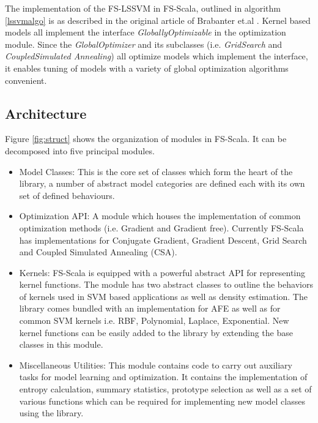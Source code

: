 \documentclass[conference, cmex10]{IEEEtran}
\begin{document}
The implementation of the FS-LSSVM in FS-Scala, outlined in algorithm \ref{lssvmalgo} is as described in the original article of Brabanter et.al \cite{DeBrabanter2010}. Kernel based models all implement the interface \textit{GloballyOptimizable} in the optimization module. Since the \textit{GlobalOptimizer} and its subclasses (i.e. \textit{GridSearch} and \textit{CoupledSimulated Annealing}) all optimize models which implement the  interface, it enables tuning of models with a variety of global optimization algorithms convenient.

\subsection*{Architecture} \label{archi}

Figure \ref{fig:struct} shows the organization of modules in FS-Scala. It can be decomposed into five principal modules.
\begin{itemize}
\item Model Classes:
This is the core set of classes which form the heart of the library, a number of abstract model categories are defined each with its own set of defined behaviours. 
\item Optimization API:
A module which houses the implementation of common optimization methods (i.e. Gradient and Gradient free). Currently FS-Scala has implementations for Conjugate Gradient, Gradient Descent, Grid Search and Coupled Simulated Annealing \cite{Xavier-De-Souza2010} (CSA). 
\item Kernels:
FS-Scala is equipped with a powerful abstract API for representing kernel functions. The module has two abstract classes to outline the behaviors of kernels used in SVM based applications as well as density estimation. The library comes bundled with an implementation for AFE as well as for common SVM kernels i.e. RBF, Polynomial, Laplace, Exponential. New kernel functions can be easily added to the library by extending the base classes in this module.

\item Miscellaneous Utilities:
This module contains code to carry out auxiliary tasks for model learning and optimization. It contains the implementation of entropy calculation, summary statistics, prototype selection as well as a set of various functions which can be required for implementing new model classes using the library.  

\end{itemize}
\end{document}
